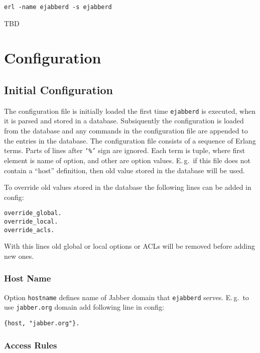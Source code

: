 \documentclass[10pt]{article}
\newcommand{\ejabberd}{\texttt{ejabberd}}
\newcommand{\Jabber}{Jabber}
\begin{document}
\begin{verbatim}
erl -name ejabberd -s ejabberd
\end{verbatim}

TBD

\section{Configuration}
\label{sec:configuration}

\subsection{Initial Configuration}
\label{sec:initconfig}

%

The configuration file is initially loaded the first time \ejabberd{} is
executed, when it is parsed and stored in a database.  Subsiquently the
configuration is loaded from the database and any commands in the configuration
file are appended to the entries in the database.  The configuration file
consists of a sequence of Erlang terms. Parts of lines after \texttt{`\%'} sign
are ignored.  Each term is tuple, where first element is name of option, and
other are option values. E.\,g.\ if this file does not contain a ``host''
definition, then old value stored in the database will be used.


To override old values stored in the database the following lines can be added
in config:
\begin{verbatim}
override_global.
override_local.
override_acls.
\end{verbatim}
With this lines old global or local options or ACLs will be removed before
adding new ones.


\subsubsection{Host Name}
\label{sec:confighostname}

Option \texttt{hostname} defines name of \Jabber{} domain that \ejabberd{}
serves.  E.\,g.\ to use \texttt{jabber.org} domain add following line in config:
\begin{verbatim}
{host, "jabber.org"}.
\end{verbatim}




\subsubsection{Access Rules}
\label{sec:configaccess}
\end{document}
